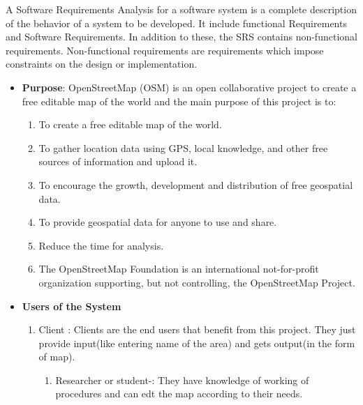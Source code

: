 

A Software Requirements Analysis for a software system is a complete 
description of the behavior of a system to be developed. It include functional Requirements
and Software Requirements. In addition to these, the SRS contains 
non-functional requirements. Non-functional requirements are 
requirements which impose constraints on the design or implementation.
\begin{itemize}
\item{\bf Purpose}: OpenStreetMap (OSM) is an open collaborative project to  create a free editable map of the world and the main purpose of this project is to:
\begin{enumerate}
\item  To  create a free editable map of the world.
\item To gather location data  using GPS, local knowledge, and other free sources of information and upload it.
\item  To encourage the growth, development and distribution of free geospatial data. 
\item  To provide geospatial data for anyone to use and share.
\item Reduce the time for analysis.
\item The OpenStreetMap Foundation is an international not-for-profit organization supporting, but not controlling, the OpenStreetMap Project.
\end{enumerate}

\item{\bf Users of the System}
\begin{enumerate} 
\item Client : Clients are the end users that benefit from this project.
They just provide input(like entering name of the area) and gets output(in the form of map).
\begin{enumerate}
\item Researcher or student-: They have knowledge of working of procedures and can edt the map according to their needs.  
\end{enumerate}
\end{enumerate}
\end{itemize}

